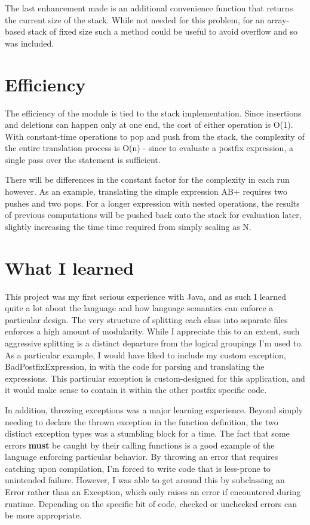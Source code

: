 \documentclass[a4paper,12pt]{article}
\begin{document}
The last enhancement made is an additional convenience function that returns the current size of the stack.  While not needed
for this problem, for an array-based stack of fixed size such a method could be useful to avoid overflow and so was included.


\section{Efficiency}
The efficiency of the module is tied to the stack implementation.  Since insertions and deletions can happen only at one end, 
the cost of either operation is O(1).  With constant-time operations to pop and push from the stack, the complexity of the 
entire translation process is O(n) - since to evaluate a postfix expression, a single pass over the statement is sufficient.

There will be differences in the constant factor for the complexity in each run however.  As an example, translating the simple expression
AB+ requires two pushes and two pops.  For a longer expression with nested operations, the results of previous computations will
be pushed back onto the stack for evaluation later, slightly increasing the time time required from simply scaling as N.


\section{What I learned}
This project was my first serious experience with Java, and as such I learned quite a lot about the language and how language 
semantics can enforce a particular design.  The very structure of splitting each class into separate files enforces a high 
amount of modularity.  While I appreciate this to an extent, such aggressive splitting is a distinct departure from the logical 
groupings I'm used to.  As a particular example, I would have liked to include my custom exception, BadPostfixExpression, in 
with the code for parsing and translating the expressions.  This particular exception is custom-designed for this application, and it
would make sense to contain it within the other postfix specific code.

In addition, throwing exceptions was a major learning experience.  Beyond simply needing to declare the thrown exception in 
the function definition,  the two distinct exception types was a stumbling block for a time.  The fact that some errors {\bf must} be caught by 
their calling functions is a good example of the language enforcing particular behavior.  By throwing an error that requires catching upon
compilation, I'm forced to write code that is less-prone to unintended failure.  However, I was able to get around this by subclassing an
Error rather than an Exception, which only raises an error if encountered during runtime.  Depending on the specific bit of code, checked
or unchecked errors can be more appropriate.
\end{document}
